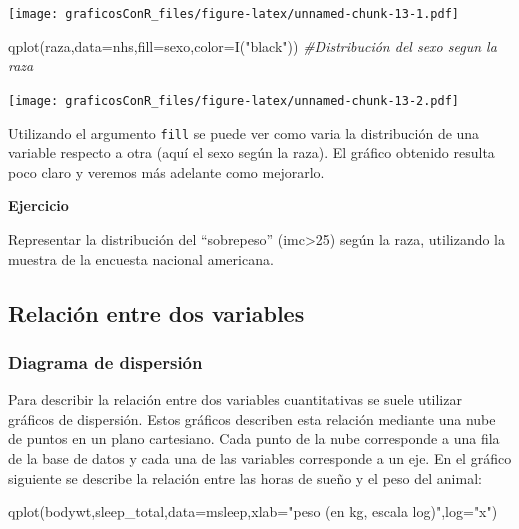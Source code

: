 \documentclass[
]{article}
\newenvironment{Shaded}{\begin{snugshade}}{\end{snugshade}}
\newcommand{\AttributeTok}[1]{\textcolor[rgb]{0.77,0.63,0.00}{#1}}
\newcommand{\CommentTok}[1]{\textcolor[rgb]{0.56,0.35,0.01}{\textit{#1}}}
\newcommand{\FunctionTok}[1]{\textcolor[rgb]{0.00,0.00,0.00}{#1}}
\newcommand{\NormalTok}[1]{#1}
\newcommand{\StringTok}[1]{\textcolor[rgb]{0.31,0.60,0.02}{#1}}
\newcounter{ejcnt}[section]
\numberwithin{ejcnt}{section}
\newenvironment{ej}[1][]{%
	\refstepcounter{ejcnt}%
	\par\medskip%
	\noindent%
	\textbf{Ejercicio \theejcnt \;\;}%
	\rmfamily%
}{\medskip}
\begin{document}
\texttt{[image: graficosConR\_files/figure-latex/unnamed-chunk-13-1.pdf]}

\begin{Shaded}
\begin{Highlighting}[]
\FunctionTok{qplot}\NormalTok{(raza,}\AttributeTok{data=}\NormalTok{nhs,}\AttributeTok{fill=}\NormalTok{sexo,}\AttributeTok{color=}\FunctionTok{I}\NormalTok{(}\StringTok{"black"}\NormalTok{)) }\CommentTok{\#Distribución del sexo segun la raza \textasciigrave{}\textasciigrave{}\textasciigrave{}}
\end{Highlighting}
\end{Shaded}

\texttt{[image: graficosConR\_files/figure-latex/unnamed-chunk-13-2.pdf]}

Utilizando el argumento \texttt{fill} se puede ver como varia la distribución de una variable respecto a otra (aquí el sexo según la raza). El gráfico obtenido resulta poco claro y veremos más adelante como mejorarlo.

\begin{ej}
Representar la distribución del ``sobrepeso'' (imc\textgreater25) según
la raza, utilizando la muestra de la encuesta nacional americana.
\end{ej}

\hypertarget{relaciuxf3n-entre-dos-variables}{%
\subsection{Relación entre dos variables}\label{relaciuxf3n-entre-dos-variables}}

\hypertarget{diagrama-de-dispersiuxf3n}{%
\subsubsection{Diagrama de dispersión}\label{diagrama-de-dispersiuxf3n}}

Para describir la relación entre dos variables cuantitativas se suele utilizar gráficos de dispersión. Estos gráficos describen esta relación mediante una nube de puntos en un plano cartesiano. Cada punto de la nube corresponde a una fila de la base de datos y cada una de las variables corresponde a un eje.
En el gráfico siguiente se describe la relación entre las horas de sueño y el peso del animal:

\begin{Shaded}
\begin{Highlighting}[]
\FunctionTok{qplot}\NormalTok{(bodywt,sleep\_total,}\AttributeTok{data=}\NormalTok{msleep,}\AttributeTok{xlab=}\StringTok{"peso (en kg, escala log)"}\NormalTok{,}\AttributeTok{log=}\StringTok{"x"}\NormalTok{)}
\end{Highlighting}
\end{Shaded}
\end{document}
